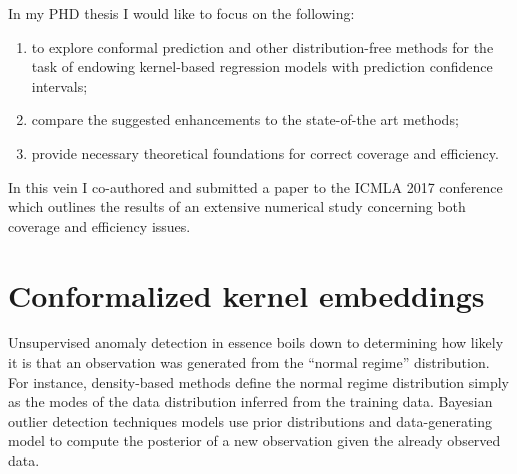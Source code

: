\documentclass{extarticle}
\begin{document}
In my PHD thesis I would like to focus on the following: \begin{enumerate}
  \item to explore conformal prediction and other distribution-free methods for
  the task of endowing kernel-based regression models with prediction confidence
  intervals;
  \item compare the suggested enhancements to the state-of-the art methods;
  \item provide necessary theoretical foundations for correct coverage and
  efficiency.
\end{enumerate}
In this vein I co-authored and submitted a paper to the ICMLA 2017 conference which
outlines the results of an extensive numerical study concerning both coverage and
efficiency issues.


\section{Conformalized kernel embeddings} %
\label{sec:conformalized_kernel_embeddings}


Unsupervised anomaly detection in essence boils down to determining how likely it
is that an observation was generated from the ``normal regime'' distribution. For
instance, density-based methods define the normal regime distribution simply as
the modes of the data distribution inferred from the training data. Bayesian outlier
detection techniques models use prior distributions and data-generating model to
compute the posterior of a new observation given the already observed data.
\end{document}
